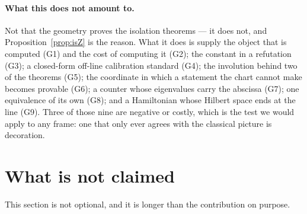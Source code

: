 \documentclass[11pt]{article}
\theoremstyle{plain}
\theoremstyle{definition}
\theoremstyle{remark}
\begin{document}
\paragraph{What this does not amount to.}
Not that the geometry proves the isolation theorems --- it does not, and
Proposition~\ref{prop:isZ} is the reason. What it does is supply the object that is
computed (G1) and the cost of computing it (G2); the constant in a refutation (G3); a
closed-form off-line calibration standard (G4); the involution behind two of the
theorems (G5); the coordinate in which a statement the chart cannot make becomes
provable (G6); a counter whose eigenvalues carry the abscissa (G7); one equivalence
of its own (G8); and a Hamiltonian whose Hilbert space ends at the line (G9). Three of
those nine are negative or costly, which is the test we would apply to any frame: one
that only ever agrees with the classical picture is decoration.

\section{What is not claimed}\label{sec:notclaimed}

This section is not optional, and it is longer than the contribution on purpose.
\end{document}
